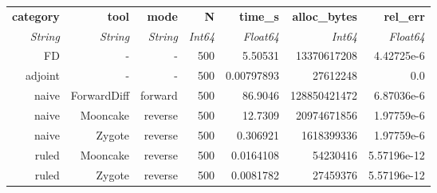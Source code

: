 \begin{tabular}{rrrrrrr}
  \toprule
  \textbf{category} & \textbf{tool} & \textbf{mode} & \textbf{N} & \textbf{time\_s} & \textbf{alloc\_bytes} & \textbf{rel\_err} \\
  \textit{String} & \textit{String} & \textit{String} & \textit{Int64} & \textit{Float64} & \textit{Int64} & \textit{Float64} \\
  \midrule
  FD & - & - & 500 & 5.50531 & 13370617208 & 4.42725e-6 \\
  adjoint & - & - & 500 & 0.00797893 & 27612248 & 0.0 \\
  naive & ForwardDiff & forward & 500 & 86.9046 & 128850421472 & 6.87036e-6 \\
  naive & Mooncake & reverse & 500 & 12.7309 & 20974671856 & 1.97759e-6 \\
  naive & Zygote & reverse & 500 & 0.306921 & 1618399336 & 1.97759e-6 \\
  ruled & Mooncake & reverse & 500 & 0.0164108 & 54230416 & 5.57196e-12 \\
  ruled & Zygote & reverse & 500 & 0.0081782 & 27459376 & 5.57196e-12 \\
  \bottomrule
\end{tabular}
